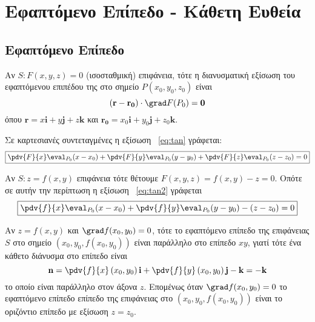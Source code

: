 


\geometry{top=1cm}

\pagestyle{vangelis}
\everymath{\displaystyle}
\setcounter{chapter}{1}




\chapter*{Εφαπτόμενο Επίπεδο - Κάθετη Ευθεία}

\section*{Εφαπτόμενο Επίπεδο}


\begin{myitemize}
  \item Αν $S: F(x,y,z)=0$ (ισοσταθμική) επιφάνεια, τότε η διανυσματική εξίσωση του 
    εφαπτόμενου επιπέδου της στο σημείο $ P(x_{0}, y_{0}, z_{0}) $ είναι
    \begin{equation}\label{eq:tan}
      (\mathbf{r} - \mathbf{r_{0}})\cdot \grad F(P_{0})= \mathbf{0} 
    \end{equation} 
    όπου $ \mathbf{r}=x \mathbf{i}+y \mathbf{j}+z \mathbf{k} $ και 
    $ \mathbf{r_{0}}=x_{0} \mathbf{i}+ y _{0} \mathbf{j}+ z_{0} \mathbf{k} $.

    Σε καρτεσιανές συντεταγμένες η εξίσωση ~\eqref{eq:tan} γράφεται:
    \begin{equation}\label{eq:tan2}
      \boxed{		
        \pdv{F}{x}\eval_{P_{0}} (x-x_{0}) + \pdv{F}{y}\eval_{P_{0}} (y-y_{0}) +
        \pdv{F}{z}\eval_{P_{0}} (z-z_{0}) =0 
      } 
    \end{equation}

  \item Αν $ S: z=f(x,y) $ επιφάνεια τότε θέτουμε $ F(x,y,z) =  f(x,y) - z = 0 $. 
    Οπότε σε αυτήν την περίπτωση η εξίσωση ~\eqref{eq:tan2} γράφεται
    \[
      \boxed{
        \pdv{f}{x}\eval_{P_{0}} (x - x_{0}) + 
        \pdv{f}{y}\eval_{P_{0}} (y - y_{0}) - (z - z_{0}) = 0 
      }
    \] 
\end{myitemize}

\begin{rem}
  Αν $ z=f(x,y) $ και $ \grad f(x_{0}, y_{0}) = 0 $, τότε το εφαπτόμενο επίπεδο 
  της επιφάνειας $S$ στο σημείο $ (x_{0}, y_{0}, f(x_{0}, y_{0})) $ είναι 
  παράλληλο στο επίπεδο $ xy $, γιατί τότε ένα κάθετο διάνυσμα στο επίπεδο είναι 
  \[
    \mathbf{n} = \pdv{f}{x} \left(x_{0}, y_{0}\right)  \mathbf{i} + 
    \pdv{f}{y} \left(x_{0}, y_{0}\right) \mathbf{j} - \mathbf{k} = - \mathbf{k}
  \] 
  το οποίο είναι παράλληλο στον άξονα $z$. Επομένως όταν 
  $ \grad f(x_{0}, y_{0}) = 0 $ το εφαπτόμενο επίπεδο επίπεδο της επιφάνειας στο 
  $ (x_{0}, y_{0}, f(x_{0}, y_{0})) $ είναι το οριζόντιο επίπεδο με εξίσωση 
  $ z = z_{0} $.
\end{rem}

